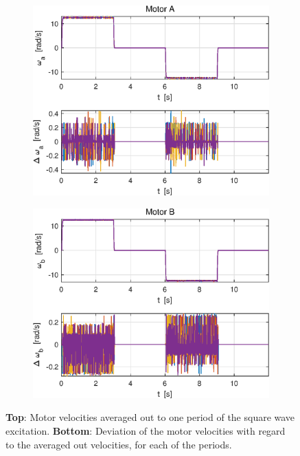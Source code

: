 \documentclass[a4paper,kul]{kulakarticle} %
\begin{document}
\begin{figure}[htp!]
	\centering
	\begin{subfigure}[b]{0.49\textwidth}
		\centering
		\includegraphics[width=\textwidth]{omegaA_deltaomegaA.eps}
	\end{subfigure}
	\hfill
	\begin{subfigure}[b]{0.49\textwidth}  
		\centering 
		\includegraphics[width=\textwidth]{omegaB_deltaomegaB.eps}
	\end{subfigure}
	\caption[Average velocity]{\textbf{Top}: Motor velocities averaged out to one period of the square wave excitation. \textbf{Bottom}: Deviation of the motor velocities with regard to the averaged out velocities, for each of the periods.} 
	\label{fig:omega_deltaomega}
\end{figure}
\end{document}
